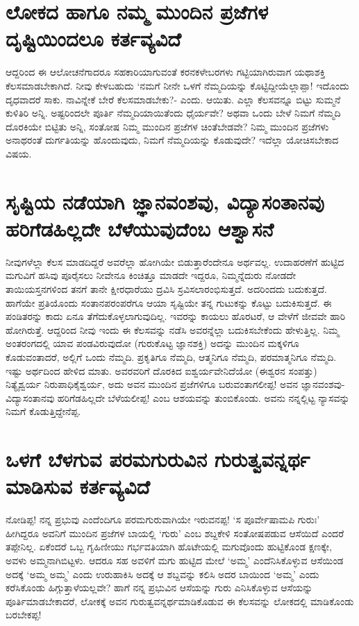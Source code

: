 \section*{ಲೋಕದ ಹಾಗೂ ನಮ್ಮ ಮುಂದಿನ ಪ್ರಜೆಗಳ ದೃಷ್ಟಿಯಿಂದಲೂ ಕರ್ತವ್ಯವಿದೆ}

ಆದ್ದರಿಂದ ಈ ಆಲೋಚನೆಗಾದರೂ ಸಹಕಾರಿಯಾಗುವಂತೆ ಕರನಕಳೇಬರಗಳು ಗಟ್ಟಿಯಾಗಿರುವಾಗ ಯಥಾಶಕ್ತಿ ಕೆಲಸಮಾಡಬೇಕಾಗಿದೆ. ನೀವು ಕೇಳಬಹುದು `ನಮಗೆ ನೀನೇ ಒಳಗೆ ನೆಮ್ಮದಿಯನ್ನು ಕೊಟ್ಟಿದ್ದೀಯೆಲ್ಲಾಪ್ಪಾ! ಇದೊಂದು ದೃಧವಾದರೆ ಸಾಕು. ನಾವಿನ್ನೇಕೆ ಬೇರೆ ಕೆಲಸಮಾಡಬೇಕು?- ಎಂದು. ಆಯಿತು. ಎಲ್ಲಾ ಕೆಲಸವನ್ನೂ ಬಿಟ್ಟು ಸುಮ್ಮನೆ ಕುಳಿತಿರಿ ಅನ್ನಿ. ಅಷ್ಟರಿಂದಲೇ ಪೂರ್ತಿ ನೆಮ್ಮದಿಯಾಯಿತೆಂದು ಧೈರ್ಯವೇ? ಅಥವಾ ಒಂದು ಬೇಳೆ ನಿಮಗೆ ನೆಮ್ಮದಿ ದೊರಕಿಯೇ ಬಿಟ್ಟಿತು ಅನ್ನಿ, ಸಂತೋಷ ನಿಮ್ಮ ಮುಂದಿನ ಪ್ರಜೆಗಳ ಚಿಂತೆಬೇಡವೇ? ನಿಮ್ಮ ಮುಂದಿನ ಪ್ರಜೆಗಳು ಅನಾಥರಂತೆ ದುರ್ಗತಿಯನ್ನು ಹೊಂದುವುದು, ನಿಮಗೆ ನೆಮ್ಮದಿಯನ್ನು ಕೊಡುವುದೇ? ಇದೆಲ್ಲಾ ಯೋಚಿಸಬೇಕಾದ ವಿಷಯ.

\section*{ಸೃಷ್ಟಿಯ ನಡೆಯಾಗಿ ಜ್ಞಾನವಂಶವು, ವಿದ್ಯಾಸಂತಾನವು ಹರಿಗೆಡಹಿಲ್ಲದೇ ಬೆಳೆಯುವುದೆಂಬ ಆಶ್ವಾಸನೆ}

ನೀವುಗಳೆಲ್ಲಾ ಕೆಲಸ ಮಾಡದಿದ್ದರೆ ಅವರೆಲ್ಲಾ ಹೋಗಿಯೇ ಬಿಡುತ್ತಾರೆಂದೇನೂ ಅರ್ಥವಲ್ಲ. ಉದಾಹರಣೆಗೆ ಹುಟ್ಟಿದ ಮಗುವಿಗೆ ಹಸಿವು ಪೂರೈಸಲು ನೀವೇನೂ ಕಿಂಚಿತ್ತೂ ಮಾಡದೇ ಇದ್ದರೂ, ನಿಮ್ಮನ್ನೆದುರು ನೋಡದೇ ತಾಯಿಯಸ್ತನಗಳಿಂದ ತನಗೆ ತಾನೇ ಕ್ಷೀರಧಾರೆಯು ದ್ರವಿಸಿ ಸ್ರವಿಸಲಾರಂಭಿಸುತ್ತದೆ. ಅದರಿಂದದು ಬದುಕುತ್ತದೆ. ಹಾಗೆಯೇ ಪ್ರತಿಯೊಂದು ಸಂತಾನಪರಂಪರೆಗೂ ಆಯಾ ಸೃಷ್ಟಿಯೇ ತನ್ನ ಗುಟುಕನ್ನು ಕೊಟ್ಟು ಬದುಕಿಸುತ್ತದೆ. ಈ ಪಂಡಿತರನ್ನು ಕಾದು ಏನೂ ತೆಗೆದುಕೊಳ್ಳಲಾಗುವುದಿಲ್ಲ. ಇವರನ್ನು ಕಾಯಲು ಹೊರಟರೆ, ಆ ವೇಳೆಗೆ ಜೀವವೇ ಹಾರಿ ಹೋಗಿರುತ್ತೆ. ಆದ್ದರಿಂದ ನೀವು ಇಂದು ಈ ಕೆಲಸವನ್ನು ನಡೆಸಿ ಅವರನ್ನೆಲ್ಲಾ ಬದುಕಿಸಬೇಕೆಂದು ಹೇಳುತ್ತಿಲ್ಲ. ನಿಮ್ಮ ಅಂತರಂಗದಲ್ಲಿ ಯಾವ ಪಂಡವಿರುವುದೋ (ಗುರುಕೊಟ್ಟ ಜ್ಞಾನಶಕ್ತಿ) ಅದನ್ನು ಮುಂದಿನ ಮಕ್ಕಳಿಗೂ ಕೊಡುವಂತಾದರೆ, ಅಲ್ಲಿಗೆ ಒಂದು ನೆಮ್ಮದಿ. ಪ್ರಕೃತಿಗೂ ನೆಮ್ಮದಿ, ಆತ್ಮನಿಗೂ ನೆಮ್ಮದಿ, ಪರಮಾತ್ಮನಿಗೂ ನೆಮ್ಮದಿ. ಇಷ್ಟು ಅರ್ಥದಿಂದ ಹೇಳಿದ ಮಾತು. ಅವರವರಿಗೆ ದೊರಕಿದ ಐಶ್ವರ್ಯವೇನಿದೆಯೋ (ಈಶ್ವರನ ಸಂಪತ್ತು) ನಿತ್ಯೈಶ್ವರ್ಯ ನಿರುಪಾಧಿಕೈಶ್ವರ್ಯ, ಅದು ಅವನ ಮುಂದಿನ ಪ್ರಜೆಗಳಿಗೂ ಬರುವಂತಾಗಲೀಪ್ಪ! ಅವನ ಜ್ಞಾನವಂಶವು- ವಿದ್ಯಾಸಂತಾನವು ಹರಿಗೆಡಹಿಲ್ಲದೇ ಬೆಳೆಯಲೀಪ್ಪ! ಎಂಬ ಆಶಯವನ್ನು ತುಂಬಿಕೊಂಡು. ಅವನು ನನ್ನಲ್ಲಿಟ್ಟ ನ್ಯಾಸವನ್ನು ನಿಮಗೆ ಕೊಡುತ್ತಿದ್ದೇನೆಪ್ಪ.

\section*{ಒಳಗೆ ಬೆಳಗುವ ಪರಮಗುರುವಿನ ಗುರುತ್ವವನ್ನರ್ಥ ಮಾಡಿಸುವ ಕರ್ತವ್ಯವಿದೆ}

ನೋಡಿಪ್ಪ! ನನ್ನ ಪ್ರಭುವು ಎಂದೆಂದಿಗೂ ಪರಮಗುರುವಾಗಿಯೇ ಇರುವನಪ್ಪ! `ಸ ಪೂರ್ವೇಷಾಮಪಿ ಗುರುಃ' ಹೀಗಿದ್ದರೂ ಅವನಿಗೆ ಮುಂದಿನ ಪ್ರಜೆಗಳ ಬಾಯಲ್ಲಿ `ಗುರು' ಎಂಬ ಶಬ್ದಕೇಳಿ ಸಂತೋಷಪಡುವ ಆಸೆಯಿದೆ ಎಂದರೆ ತಪ್ಪೇನಿಲ್ಲ. ಏಕೆಂದರೆ ಒಬ್ಬ ಗೃಹಿಣೀಯು ಗರ್ಭವತಿಯಾಗಿ ಹೊಟೇಯಲ್ಲಿ ಮಗುವೊಂದು ಹುಟ್ಟಿಕೊಂಡ ಕ್ಷಣಕ್ಕೇ, ಅವಳು ಅಮ್ಮನಾಗಿಬಿಟ್ಟಳು. ಆದರೂ ಸಹ ಅವಳಿಗೆ ಮಗು ಹುಟ್ಟಿದ ಮೇಲೆ `ಅಮ್ಮ' ಎಂದೆನಿಸಿಕೊಳ್ಳುವ ಆಸೆಯಿಂಡ ಅದಕ್ಕೆ `ಅಮ್ಮ ಅಮ್ಮ' ಎಂದು ಉರುಹಾಕಿಸಿ ಅದಕ್ಕೆ ಆ ಶಬ್ದವನ್ನು ಕಲಿಸಿ ಅದರ ಬಾಯಿಂದ `ಅಮ್ಮ' ಎಂದು ಕರೆಸಿಕೊಂಡು ಹಿಗ್ಗುತ್ತಾಳೆಯಲ್ಲವೇ? ಹಾಗೆ ನನ್ನ ಪ್ರಭುವಿನ ಆಸೆಯನ್ನು ಗುರು ಎನಿಸಿಕೊಳ್ಳುವ ಆಸೆಯನ್ನು ಪೂರ್ತಿಮಾಡಬೇಕಾದರೆ, ಲೋಕಕ್ಕೆ ಅವನ ಗುರುತ್ವವನ್ನರ್ಥಮಾಡಿಕೊಡುವ ಈ ಕೆಲಸವನ್ನು ಲೋಕದಲ್ಲಿ ಮಾಡಿಕೊಂಡು ಬರಬೇಕಪ್ಪ!

